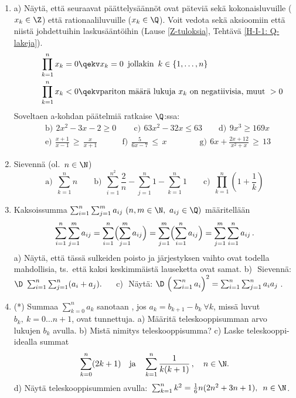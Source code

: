 \begin{enumerate}
\item
a) Näytä, että seuraavat päättelysäännöt ovat päteviä sekä kokonaisluvuille ($x_k\in\Z$) että
rationaaliluvuille ($x_k\in\Q$). Voit vedota sekä aksioomiin että niistä johdettuihin laskusääntöihin
(Lause \ref{Z-tuloksia}, Tehtävä \ref{H-I-1: Q-lakeja}).
\begin{align*}
&\quad\ \ \prod_{k=1}^n x_k = 0 \qekv x_k=0\,\ \text{jollakin}\,\ k\in\{1,\ldots,n\} \\
&\quad\ \ \prod_{k=1}^n x_k < 0 \qekv \text{pariton määrä lukuja $x_k$ on negatiivisia, muut}\ >0
\end{align*}
Soveltaen a-kohdan päätelmiä ratkaise $\Q$:ssa:
\vspace{1mm}
\begin{align*}
&\text{b)}\,\ 2x^2-3x-2 \ge 0 \qquad\,
 \text{c)}\,\ 63x^2-32x \le 63 \qquad
 \text{d)}\,\ 9x^3 \ge 169x \\[1mm]
&\text{e)}\,\ \frac{x+1}{x-1}\,\ge\,\frac{x}{x+1} \qquad\quad
 \text{f)}\,\ \frac{5}{6x-7}\,\le\,x \qquad\qquad
 \text{g)}\,\ 6x+\frac{2x+12}{x^2+x}\,\ge\,13
\end{align*}

\item
Sievennä (ol.\ $n\in\N$)
\[
\text{a)}\ \ \sum_{k=1}^n n \qquad
\text{b)}\ \ \sum_{i=1}^{n^2} \frac{2}{n} - \sum_{j=1}^n 1 - \sum_{k=1}^n 1 \qquad
\text{c)}\ \ \prod_{k=1}^n \left(1+\frac{1}{k}\right)
\]

\item 
Kaksoissumma $\sum_{i=1}^n\sum_{j=1}^m a_{ij}\ (n,m\in\N,\ a_{ij}\in\Q)$ määritellään
\[
\sum_{i=1}^n\sum_{j=1}^m a_{ij} = \sum_{i=1}^n\Bigl(\sum_{j=1}^m a_{ij}\Bigr) 
                                = \sum_{j=1}^m\Bigl(\sum_{i=1}^n a_{ij}\Bigr)
                                = \sum_{j=1}^m\sum_{i=1}^n a_{ij}\,.
\]
a) Näytä, että tässä sulkeiden poisto ja järjestyksen vaihto ovat todella mahdollisia, ts.\ 
että kaksi keskimmäistä lauseketta ovat samat. \vspace{1mm}\newline
b)\,\ Sievennä: $\D \ \sum_{i=1}^n\sum_{j=1}^n (a_i + a_j). \quad\ $
c)\,\ Näytä: $\D \ \Bigl(\,\sum_{i=1}^n a_i \Bigr)^2 = \sum_{i=1}^n\sum_{j=1}^n a_i a_j\,$.

\item (*)  \label{H-I-1: teleskooppisumma}
Summaa $\sum_{k=0}^n a_k$ sanotaan , jos $a_k=b_{k+1}-b_k\ \forall k$, 
missä luvut $b_k,\ k=0 \ldots n+1$,
ovat tunnettuja. \newline
a) Määritä teleskooppisumman arvo lukujen $b_k$ avulla.\newline
b) Mistä nimitys teleskooppisumma?\newline
c) Laske teleskooppi-idealla summat
\[
\sum_{k=0}^n (2k+1) \quad \text{ja} \quad \sum_{k=1}^n\frac{1}{k(k+1)}\,, \quad n\in\N.
\]
d) Näytä teleskooppisummien avulla:\, $\sum_{k=1}^n k^2 = \tfrac{1}{6}n(2n^2+3n+1),\,\ n\in\N$. 

\end{enumerate}